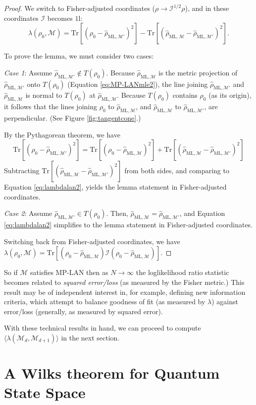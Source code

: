 \documentclass[aps,pra, twocolumn]{revtex4-1}
\newcommand{\M}{\mathcal{M}}
\newcommand{\Id}{\mathbb{I}}
\def\Id{1\!\mathrm{l}}
\newcommand{\rhohat}{\hat{\rho}}
\newcommand{\rhoML}[1]{\rhohat_{\scriptscriptstyle{\mathrm{ML},#1}}}
\begin{document}
\begin{proof}
We switch to Fisher-adjusted coordinates ($\rho \rightarrow \mathcal{I}^{1/2}\rho$), and in these coordinates $\mathcal{I}$ becomes $\Id$:
\begin{equation}
\label{eq:lambdalan2}
\lambda(\rho_{0}, \M) = \mathrm{Tr}[(\rho_{0} - \rhoML{\M'})^{2}]-  \mathrm{Tr}[(\rhoML{\M} - \rhoML{\M'})^{2}].
\end{equation}

To prove the lemma, we must consider two cases:

\emph{Case 1}: Assume $\rhoML{\M'} \not \in T(\rho_{0})$. Because $\rhoML{\M}$ is the metric projection of $\rhoML{\M'}$ onto $T(\rho_{0})$ (Equation \eqref{eq:MP-LANmle2}),  the line joining $\rhoML{\M'}$ and $\rhoML{\M}$ is normal to $T(\rho_{0})$ at $\rhoML{\M}$. Because $T(\rho_{0})$ contains $\rho_{0}$ (as its origin), it follows that the lines joining $\rho_{0}$ to $\rhoML{\M}$, and $\rhoML{\M}$ to $\rhoML{\M'}$, are perpendicular. (See Figure \ref{fig:tangentcone}.)

 By the Pythagorean theorem, we have
\[\mathrm{Tr}[(\rho_{0} -\rhoML{\M'})^{2}] =  \mathrm{Tr}[(\rho_{0} - \rhoML{\M})^{2}] + \mathrm{Tr}[(\rhoML{\M} - \rhoML{\M'})^{2}]\]
Subtracting $\mathrm{Tr}[(\rhoML{\M} - \rhoML{\M'})^{2}]$ from both sides, and comparing to Equation \eqref{eq:lambdalan2}, yields the lemma statement in Fisher-adjusted coordinates.

\emph{Case 2}: Assume $\rhoML{\M'} \in T(\rho_{0})$. Then, $\rhoML{\M}= \rhoML{\M'}$, and Equation \eqref{eq:lambdalan2} simplifies to the lemma statement in Fisher-adjusted coordinates.


Switching back from Fisher-adjusted coordinates, we have $\lambda(\rho_{0}, \M) = \mathrm{Tr}[(\rho_{0} - \rhoML{\M})\mathcal{I}(\rho_{0} - \rhoML{\M})]$.
\end{proof}

So if $\M$ satisfies MP-LAN then as $N\rightarrow \infty$ the loglikelihood ratio statistic becomes related to \emph{squared error/loss} (as measured by the Fisher metric.) This result may be of independent interest in, for example, defining new information criteria, which attempt to balance goodness of fit (as measured by $\lambda$) against error/loss (generally, as measured by squared error).

With these technical results in hand, we can proceed to compute $\langle \lambda(\M_{d}, \M_{d+1})\rangle$ in the next section.

\section{A Wilks theorem for Quantum State Space}
\label{sec:computingllrs}
\end{document}
